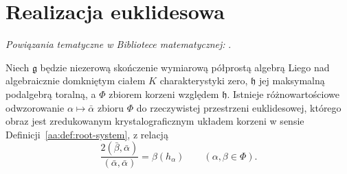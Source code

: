 \section{Realizacja euklidesowa}

\noindent\emph{Powiązania tematyczne w Bibliotece matematycznej:} .

\begin{twierdzenie}
\label{aa:tw:lie-root-realization}
Niech $\mathfrak g$ będzie niezerową skończenie wymiarową półprostą algebrą Liego nad algebraicznie domkniętym ciałem $K$ charakterystyki zero, $\mathfrak h$ jej maksymalną podalgebrą toralną, a $\Phi$ zbiorem korzeni względem $\mathfrak h$. Istnieje różnowartościowe odwzorowanie $\alpha\mapsto\bar\alpha$ zbioru $\Phi$ do rzeczywistej przestrzeni euklidesowej, którego obraz jest zredukowanym krystalograficznym układem korzeni w sensie Definicji~\ref{aa:def:root-system}, z relacją
\[
 \frac{2(\bar\beta,\bar\alpha)}{(\bar\alpha,\bar\alpha)}
 =\beta(h_\alpha)\qquad(\alpha,\beta\in\Phi).
\]
\end{twierdzenie}
